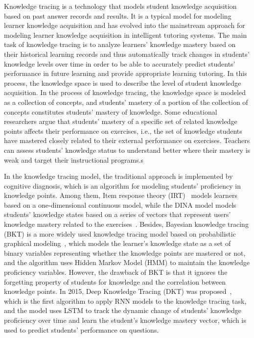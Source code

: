 Knowledge tracing is a technology that models student knowledge acquisition based on past answer records and results. It is a typical model for modeling learner knowledge acquisition and has evolved into the mainstream approach for modeling learner knowledge acquisition in intelligent tutoring systems. The main task of knowledge tracing is to analyze learners' knowledge mastery based on their historical learning records and thus automatically track changes in students' knowledge levels over time in order to be able to accurately predict students' performance in future learning and provide appropriate learning tutoring. In this process, the knowledge space is used to describe the level of student knowledge acquisition. In the process of knowledge tracing, the knowledge space is modeled as a collection of concepts, and students' mastery of a portion of the collection of concepts constitutes students' mastery of knowledge. Some educational researchers argue that students' mastery of a specific set of related knowledge points affects their performance on exercises, i.e., the set of knowledge students have mastered closely related to their external performance on exercises. Teachers can assess students' knowledge status to understand better where their mastery is weak and target their instructional programs.s

In the knowledge tracing model, the traditional approach is implemented by cognitive diagnosis, which is an algorithm for modeling students' proficiency in knowledge points. Among them, Item response theory (IRT)~\cite{pliakos_integrating_2019} models learners based on a one-dimensional continuous model, while the DINA model models students' knowledge states based on a series of vectors that represent users' knowledge mastery related to the exercises~\cite{huang2020utilizing}. Besides, Bayesian knowledge tracing (BKT) is a more widely used knowledge tracing model based on probabilistic graphical modeling~\cite{yudelson2013individualized}, which models the learner's knowledge state as a set of binary variables representing whether the knowledge points are mastered or not, and the algorithm uses Hidden Markov Model (HMM) to maintain the knowledge proficiency variables. However, the drawback of BKT is that it ignores the forgetting property of students for knowledge and the correlation between knowledge points. In 2015, Deep Knowledge Tracing (DKT) was proposed~\cite{piech2015deep}, which is the first algorithm to apply RNN models to the knowledge tracing task, and the model uses LSTM to track the dynamic change of students' knowledge proficiency over time and learn the student's knowledge mastery vector, which is used to predict students' performance on questions.

